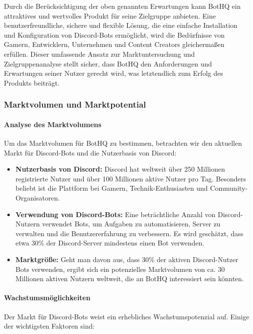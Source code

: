 
Durch die Berücksichtigung der oben genannten Erwartungen kann BotHQ ein attraktives und wertvolles Produkt für seine Zielgruppe anbieten. Eine benutzerfreundliche, sichere und flexible Lösung, die eine einfache Installation und Konfiguration von Discord-Bots ermöglicht, wird die Bedürfnisse von Gamern, Entwicklern, Unternehmen und Content Creators gleichermaßen erfüllen.
Dieser umfassende Ansatz zur Marktuntersuchung und Zielgruppenanalyse stellt sicher, dass BotHQ den Anforderungen und Erwartungen seiner Nutzer gerecht wird, was letztendlich zum Erfolg des Produkts beiträgt.

\subsubsection{Marktvolumen und Marktpotential}\label{marktvolumen-und-marktpotential}

\paragraph{Analyse des Marktvolumens}
Um das Marktvolumen für BotHQ zu bestimmen, betrachten wir den aktuellen Markt für Discord-Bots und die Nutzerbasis von Discord:

\begin{itemize}
  \item \textbf{Nutzerbasis von Discord:}
  Discord hat weltweit über 250 Millionen registrierte Nutzer und über 100 Millionen aktive Nutzer pro Tag. Besonders beliebt ist die Plattform bei Gamern, Technik-Enthusiasten und Community-Organisatoren.

  \item \textbf{Verwendung von Discord-Bots:}
  Eine beträchtliche Anzahl von Discord-Nutzern verwendet Bots, um Aufgaben zu automatisieren, Server zu verwalten und die Benutzererfahrung zu verbessern. Es wird geschätzt, dass etwa 30\% der Discord-Server mindestens einen Bot verwenden.

  \item \textbf{Marktgröße:}
  Geht man davon aus, dass 30\% der aktiven Discord-Nutzer Bots verwenden, ergibt sich ein potenzielles Marktvolumen von ca. 30 Millionen aktiven Nutzern weltweit, die an BotHQ interessiert sein könnten.
\end{itemize}

\paragraph{Wachstumsmöglichkeiten}
Der Markt für Discord-Bots weist ein erhebliches Wachstumspotenzial auf. Einige der wichtigsten Faktoren sind:

